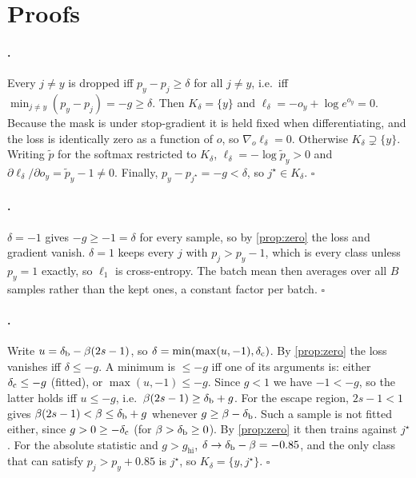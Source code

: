 \section{Proofs}
\label{app:proofs}

\paragraph{.}
Every $j \ne y$ is dropped iff $p_y - p_j \ge \delta$ for all $j \ne y$, i.e.\ iff
$\min_{j\ne y}(p_y - p_j) = -g \ge \delta$. Then $K_\delta = \{y\}$ and
$\ell_\delta = -o_y + \log e^{o_y} = 0$. Because the mask is under stop-gradient it is held fixed
when differentiating, and the loss is identically zero as a function of $o$, so
$\nabla_o \ell_\delta = 0$. Otherwise $K_\delta \supsetneq \{y\}$. Writing $\tilde p$ for the
softmax restricted to $K_\delta$, $\ell_\delta = -\log \tilde p_y > 0$ and
$\partial \ell_\delta / \partial o_y = \tilde p_y - 1 \ne 0$. Finally,
$p_y - p_{j^\star} = -g < \delta$, so $j^\star \in K_\delta$. \hfill$\square$

\paragraph{.}
$\delta = -1$ gives $-g \ge -1 = \delta$ for every sample, so by \cref{prop:zero} the loss and
gradient vanish. $\delta = 1$ keeps every $j$ with $p_j > p_y - 1$, which is every class unless
$p_y = 1$ exactly, so $\ell_1$ is cross-entropy. The batch mean then averages over all $B$ samples
rather than the kept ones, a constant factor per batch. \hfill$\square$

\paragraph{.}
Write $u = \delta_{\mathrm{b}} - \beta(2s - 1)$, so $\delta = \min(\max(u, -1), \delta_{\mathrm{c}})$. By
\cref{prop:zero} the loss vanishes iff $\delta \le -g$. A minimum is $\le -g$ iff one of its
arguments is: either $\delta_{\mathrm{c}} \le -g$ (fitted), or $\max(u, -1) \le -g$. Since $g < 1$ we have
$-1 < -g$, so the latter holds iff $u \le -g$, i.e.\ $\beta(2s - 1) \ge \delta_{\mathrm{b}} + g$. For the
escape region, $2s - 1 < 1$ gives $\beta(2s - 1) < \beta \le \delta_{\mathrm{b}} + g$ whenever
$g \ge \beta - \delta_{\mathrm{b}}$. Such a sample is not fitted either, since $g > 0 \ge -\delta_{\mathrm{c}}$ (for
$\beta > \delta_{\mathrm{b}} \ge 0$). By \cref{prop:zero} it then trains against $j^\star$. For the absolute
statistic and $g > g_{\mathrm{hi}}$, $\delta \to \delta_{\mathrm{b}} - \beta = -0.85$, and the only class
that can satisfy $p_j > p_y + 0.85$ is $j^\star$, so $K_\delta = \{y, j^\star\}$. \hfill$\square$

